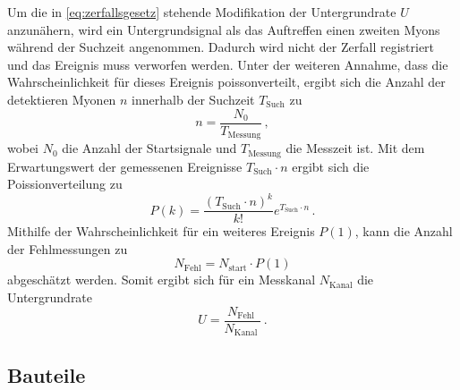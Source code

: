 Um die in \autoref{eq:zerfallsgesetz} stehende Modifikation der Untergrundrate $U$ anzunähern,
wird ein Untergrundsignal als das Auftreffen einen zweiten Myons während der Suchzeit angenommen.
Dadurch wird nicht der Zerfall registriert und das Ereignis muss verworfen werden.
Unter der weiteren Annahme, 
dass die Wahrscheinlichkeit für dieses Ereignis poissonverteilt, 
ergibt sich die Anzahl der detektieren Myonen $n$ innerhalb der Suchzeit $T_\text{Such}$ zu
\begin{equation*}
    n=\frac{N_{0}}{T_{\text{Messung}}} \, ,
\end{equation*}
wobei $N_0$ die Anzahl der Startsignale und $T_{\text{Messung}}$ die Messzeit ist.
Mit dem Erwartungswert der gemessenen Ereignisse $T_\text{Such} \cdot n$ ergibt sich die Poissionverteilung zu
\begin{equation*}
    P(k)=\frac{\left(T_{\mathrm{Such}} \cdot n\right)^k}{k !} e^{T_{ \mathrm{Such}} \cdot n} \, .
\end{equation*}
Mithilfe der Wahrscheinlichkeit für ein weiteres Ereignis $P(1)$, 
kann die Anzahl der Fehlmessungen zu
\begin{equation*}
    N_{\mathrm{Fehl}}=N_{\mathrm{start}} \cdot P(1)
\end{equation*}
abgeschätzt werden.
Somit ergibt sich für ein Messkanal $N_\text{Kanal}$ die Untergrundrate
\begin{equation}\label{eq:untergrundrate}
    U=\frac{N_{\text {Fehl }}}{N_{\text {Kanal }}} \, .
\end{equation}


\subsection*{Bauteile}

